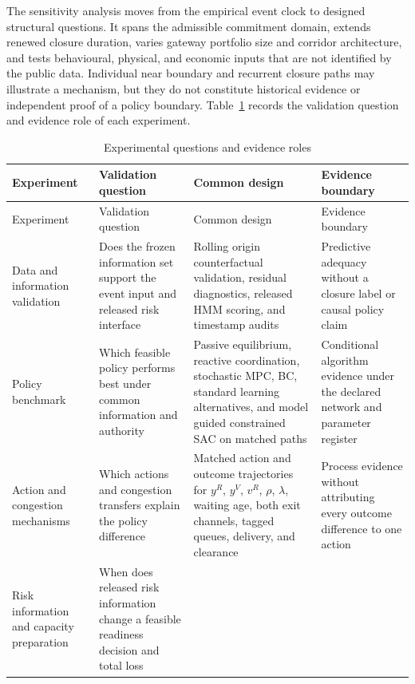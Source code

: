 \documentclass[a4paper,fleqn]{cas-sc}
\begin{document}
The sensitivity analysis moves from the empirical event clock to designed
structural questions. It spans the admissible commitment domain, extends renewed
closure duration, varies gateway portfolio size and corridor architecture, and
tests behavioural, physical, and economic inputs that are not identified by the
public data. Individual near boundary and recurrent closure paths may illustrate
a mechanism, but they do not constitute historical evidence or independent
proof of a policy boundary. Table~\ref{tab:experiment-roadmap-84} records the
validation question and evidence role of each experiment.

\begingroup
\scriptsize
\setlength{\tabcolsep}{4.5pt}
\begin{longtable}{>{\RaggedRight\arraybackslash}p{}
                  >{\RaggedRight\arraybackslash}p{}
                  >{\RaggedRight\arraybackslash}p{}
                  >{\RaggedRight\arraybackslash}p{}}
\caption{Experimental questions and evidence roles}
\label{tab:experiment-roadmap-84}\\
\toprule
Experiment & Validation question & Common design & Evidence boundary \\
\midrule
\endfirsthead
\toprule
Experiment & Validation question & Common design & Evidence boundary \\
\midrule
\endhead
Data and information validation
& Does the frozen information set support the event input and released risk interface
& Rolling origin counterfactual validation, residual diagnostics, released HMM scoring, and timestamp audits
& Predictive adequacy without a closure label or causal policy claim \\
Policy benchmark
& Which feasible policy performs best under common information and authority
& Passive equilibrium, reactive coordination, stochastic MPC, BC, standard learning alternatives, and model guided constrained SAC on matched paths
& Conditional algorithm evidence under the declared network and parameter register \\
Action and congestion mechanisms
& Which actions and congestion transfers explain the policy difference
& Matched action and outcome trajectories for $y^R$, $y^V$, $v^R$, $\rho$, $\lambda$, waiting age, both exit channels, tagged queues, delivery, and clearance
& Process evidence without attributing every outcome difference to one action \\
Risk information and capacity preparation
& When does released risk information change a feasible readiness decision and total loss

\end{longtable}
\end{document}

